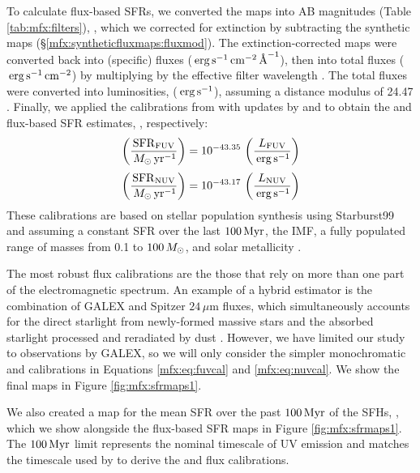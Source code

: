 \documentclass[iop, tighten]{emulateapj}
\begin{document}
To calculate flux-based SFRs, we converted the \fxobs{} maps into AB magnitudes
(Table \ref{tab:mfx:filters}), \xobs{}, which we corrected for extinction by
subtracting the synthetic \ax{} maps (\S \ref{mfx:syntheticfluxmaps:fluxmod}).
The extinction-corrected maps were converted back into (specific) fluxes ($\,\mathrm{erg}
\,\mathrm{s}^{-1} \,\mathrm{cm}^{-2} \,\textrm{\AA}^{-1}$), then into total fluxes ($\,\mathrm{erg} \,\mathrm{s}^{-1}
\,\mathrm{cm}^{-2}$) by multiplying by the effective filter wavelength
\citep[$1538.6\ang$ for \fuv{}, $2315.7\ang$ for \nuv{};][]{Morrissey:2007}.
The total fluxes were converted into luminosities, \lx{} ($\,\mathrm{erg} \,\mathrm{s}^{-1}$),
assuming a distance modulus of 24.47 \citep{McConnachie:2005}. Finally, we
applied the calibrations from \citet{Kennicutt:1998} with updates by
\citet{Hao:2011} and \citet{Murphy:2011} \citep[see the review
by][]{Kennicutt:2012} to obtain the \fuv{} and \nuv{} flux-based SFR estimates,
\sfrx{}, respectively:
\begin{equation}
\left(\frac{\sfrfuv}{\msun\yr^{-1}}\right) =
    10^{-43.35}\,\left(\frac{\lfuv}{\erg\ssec^{-1}}\right)
\label{mfx:eq:fuvcal}
\end{equation}
\begin{equation}
\left(\frac{\sfrnuv}{\msun\yr^{-1}}\right) =
    10^{-43.17}\,\left(\frac{\lnuv}{\erg\ssec^{-1}}\right)
\label{mfx:eq:nuvcal}
\end{equation}
These calibrations are based on stellar population synthesis using Starburst99
\citep{Leitherer:1999} and assuming a constant SFR over the last $100\,\mathrm{Myr}$, the
\citet{Kroupa:2001} IMF, a fully populated range of masses from 0.1 to
$100\,M_\odot$, and solar metallicity \citep{Hao:2011}.

The most robust flux calibrations are the those that rely on more than one part
of the electromagnetic spectrum. An example of a hybrid estimator is the
combination of GALEX \fuv{} and Spitzer $24\,\mu\mathrm{m}$ fluxes, which
simultaneously accounts for the direct starlight from newly-formed massive
stars and the absorbed starlight processed and reradiated by dust
\citep[e.g.,][]{Leroy:2012}. However, we have limited our study to observations
by GALEX, so we will only consider the simpler monochromatic \fuv{} and \nuv{}
calibrations in Equations \ref{mfx:eq:fuvcal} and \ref{mfx:eq:nuvcal}. We show
the final \sfrx{} maps in Figure \ref{fig:mfx:sfrmaps1}.

We also created a map for the mean SFR over the past $100\,\mathrm{Myr}$ of the SFHs,
\sfroneh{}, which we show alongside the flux-based SFR maps in Figure
\ref{fig:mfx:sfrmaps1}. The $100\,\mathrm{Myr}$ limit represents the nominal timescale of
UV emission and matches the timescale used by \citet{Hao:2011} to derive the
\fuv{} and \nuv{} flux calibrations.
\end{document}
